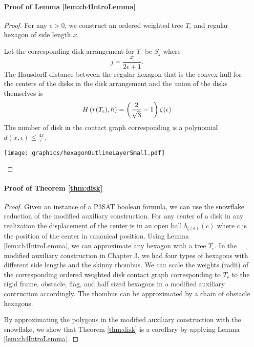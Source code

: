 \paragraph{Proof of Lemma \ref{lem:ch4IntroLemma}}
\begin{proof}
For any $\epsilon>0$, we construct an ordered weighted tree $T_\epsilon$ and regular hexagon of side length $x$. 

Let the corresponding disk arrangement for $T_\epsilon$ be $S_j$ where $$j=\frac{x}{2 \epsilon + 1}.$$  
The Hausdorff distance between the regular hexagon that is the convex hull for the centers of the disks in the disk arrangement and the union of the disks themselves is $$H\left( r(T_\epsilon),h \right) = \left( \frac{2}{\sqrt{3}} - 1 \right) \zeta(\epsilon)$$
The number of disk in the contact graph corresponding is a polynomial $d(x,\epsilon) \leq \frac{4x}{\epsilon}$.  

\begin{minipage}{\linewidth}
\begin{center}
\texttt{[image: graphics/hexagonOutlineLayerSmall.pdf]}
\label{fig:hexagonOutlineLayerSmall.pdf}
\end{center}
\end{minipage}
\end{proof}

\paragraph{Proof of Theorem \ref{thm:disk}}

\begin{proof}
Given an instance of a P3SAT boolean formula, we can use the snowflake reduction of the modified auxiliary construction.  
For any center of a disk in any realization the displacement of the center is in an open ball $b_{\zeta(\epsilon)}(c)$ where $c$ is the position of the center in canonical position.  
Using Lemma \ref{lem:ch4IntroLemma}, we can approximate any hexagon with a tree $T_\epsilon$.  
In the modified auxiliary construction in Chapter 3, we had four types of hexagons with different side lengths and the skinny rhombus.  
We can scale the weights (radii) of the corresponding ordered weighted disk contact graph corresponding to $T_\epsilon$ to the rigid frame, obstacle, flag, and half sized hexagons in a modified auxiliary contruction accordingly.  
The rhombus can be approximated by a chain of obstacle hexagons.

By approximating the polygons in the modified auxiliary construction with the snowflake, we show that Theorem \ref{thm:disk} is a corollary by applying Lemma \ref{lem:ch4IntroLemma}.  
\end{proof}

